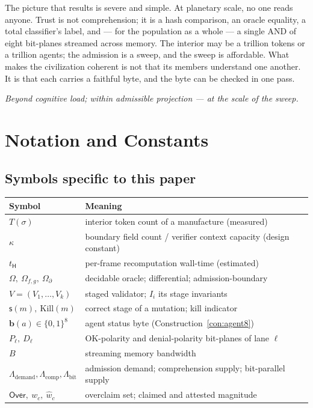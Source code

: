 \documentclass[11pt,oneside]{book}
\theoremstyle{definition}
\theoremstyle{plain}
\theoremstyle{remark}
\newcommand{\chainH}{\mathsf{H}}               %
\newcommand{\CL}{\kappa}                       %
\newcommand{\Over}{\mathsf{Over}}
\newcommand{\abyte}{\mathbf{b}}                %
\newcommand{\Bw}{B}                            %
\newcommand{\Kill}{\mathrm{Kill}}
\newcommand{\stg}{\mathsf{s}}                  %
\begin{document}
The picture that results is severe and simple. At planetary scale, no one reads anyone. Trust is
not comprehension; it is a hash comparison, an oracle equality, a total classifier's label, and
--- for the population as a whole --- a single AND of eight bit-planes streamed across memory. The
interior may be a trillion tokens or a trillion agents; the admission is a sweep, and the sweep is
affordable. What makes the civilization coherent is not that its members understand one another. It
is that each carries a faithful byte, and the byte can be checked in one pass.

\begin{center}\itshape Beyond cognitive load; within admissible projection --- at the scale of the sweep.\end{center}

\appendix
\chapter{Notation and Constants}

\section*{Symbols specific to this paper}
\begin{tabular}{ll}
\toprule
Symbol & Meaning\\
\midrule
$T(\sigma)$ & interior token count of a manufacture (measured)\\
$\CL$ & boundary field count / verifier context capacity (design constant)\\
$t_{\chainH}$ & per-frame recomputation wall-time (estimated)\\
$\Omega,\ \Omega_{f,g},\ \Omega_\partial$ & decidable oracle; differential; admission-boundary\\
$V=(V_1,\dots,V_k)$ & staged validator; $I_i$ its stage invariants\\
$\stg(m),\ \Kill(m)$ & correct stage of a mutation; kill indicator\\
$\abyte(a)\in\{0,1\}^8$ & agent status byte (Construction~\ref{con:agent8})\\
$P_\ell,\ D_\ell$ & OK-polarity and denial-polarity bit-planes of lane $\ell$\\
$\Bw$ & streaming memory bandwidth\\
$\Lambda_{\text{demand}},\Lambda_{\text{comp}},\Lambda_{\text{bit}}$ & admission demand; comprehension supply; bit-parallel supply\\
$\Over,\ w_c,\ \widehat w_c$ & overclaim set; claimed and attested magnitude\\
\bottomrule
\end{tabular}
\end{document}
